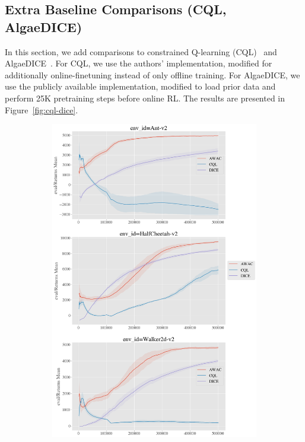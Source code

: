 \documentclass[conference]{IEEEtran}
\begin{document}
\pagebreak

\subsection{Extra Baseline Comparisons (CQL, AlgaeDICE)}

In this section, we add comparisons to constrained Q-learning (CQL)~\citep{kumar2020cql} and AlgaeDICE~\citep{nachum2019dualdice}. For CQL, we use the authors' implementation, modified for additionally online-finetuning instead of only offline training. For AlgaeDICE, we use the publicly available implementation, modified to load prior data and perform 25K pretraining steps before online RL. The results are presented in Figure~\ref{fig:cql-dice}.

\begin{figure}[H]
    \centering
    \begin{subfigure}[b]{0.49\textwidth}
        \center
        \includegraphics[width=\textwidth]{figures/iclrrebuttal/d4rl_mujoco_comparisons.png}

\end{subfigure}
\end{figure}
\end{document}
